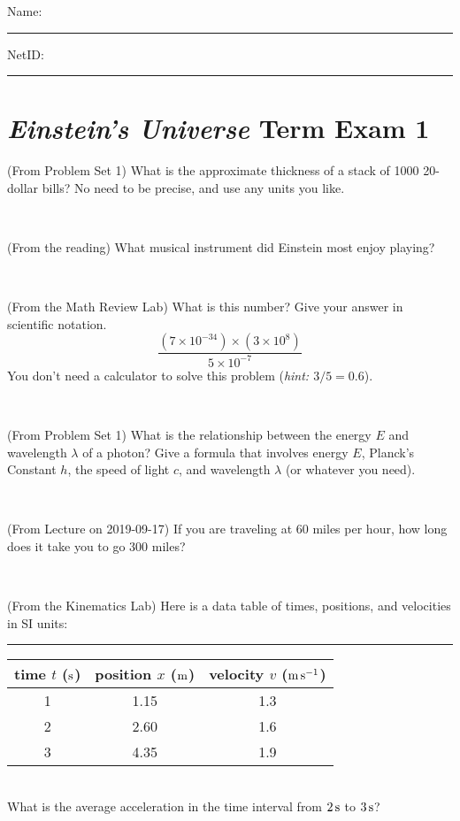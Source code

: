 \documentclass[12pt, letterpaper]{article}
\begin{document}
\noindent
Name: \rule[-1ex]{0.60\textwidth}{0.1pt}
NetID: \rule[-1ex]{0.20\textwidth}{0.1pt}

\section*{\textsl{Einstein's Universe} Term Exam 1}
\setcounter{problem}{1}


\begin{problem} (From Problem Set 1)
What is the approximate thickness of a stack of 1000 20-dollar bills?
No need to be precise, and use any units you like.
\end{problem}


\vfill ~

\begin{problem} (From the reading)
What musical instrument did Einstein most enjoy playing?
\end{problem}


\vfill ~

\begin{problem} (From the Math Review Lab)
What is this number? Give your answer in scientific notation.
$$
\frac{(7\times10^{-34})\times(3\times10^8)}{5\times10^{-7}}
$$
You don't need a calculator to solve this problem (\textit{hint: $3/5=0.6$}).
\end{problem}


\vfill ~

\begin{problem} (From Problem Set 1)
What is the relationship between the energy $E$ and wavelength
$\lambda$ of a photon? Give a formula that involves energy $E$,
Planck's Constant $h$, the speed of light $c$, and wavelength
$\lambda$ (or whatever you need).
\end{problem}

\vfill ~


\clearpage


\begin{problem} (From Lecture on 2019-09-17)
If you are traveling at 60 miles per hour, how long does
it take you to go 300 miles?
\end{problem}


\vfill ~

\begin{problem} (From the Kinematics Lab)
Here is a data table of times, positions, and velocities in SI units:\\
\rule{1.0in}{0pt}\begin{tabular}{c|c|c}
time $t$ ($\mathrm{s}$) & position $x$ ($\mathrm{m}$) & velocity $v$ ($\mathrm{m}\,\mathrm{s}^{-1}$) \\
\hline
1 & 1.15 & 1.3 \\
2 & 2.60 & 1.6 \\
3 & 4.35 & 1.9 \\
\hline
\end{tabular}\\
What is the average acceleration in the time interval from $2\,\mathrm{s}$ to $3\,\mathrm{s}$?
\end{problem}
\end{document}

